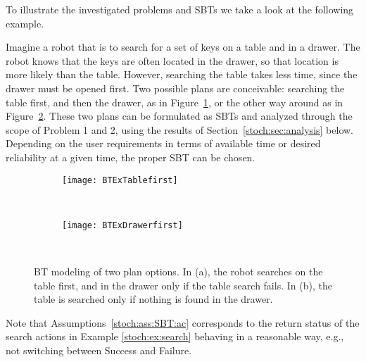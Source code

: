 To illustrate the investigated problems and SBTs we take a look at the following example.
\begin{example}
\label{stoch:ex:search}
Imagine a robot that is to search for a set of keys on a table and in a drawer. The robot knows that the keys are often located in the drawer, so that location is more likely than the table. However, searching the table takes less time, since the drawer must be opened first. Two possible plans are conceivable: searching the table first, and then the drawer, as in Figure~\ref{stoch:fig:searcht}, or the other way around as in Figure~\ref{stoch:fig:searchd}. These two plans can be formulated as SBTs and analyzed through the scope of Problem 1 and 2, using the results of Section~\ref{stoch:sec:analysis} below. Depending on the user requirements in terms of available time or desired reliability at a given time, the proper SBT can be chosen.
\begin{figure}
        \centering
        \begin{subfigure}[b]{0.5\columnwidth}
                \centering
                \texttt{[image: BTExTablefirst]}
                \caption{}%
                 \label{stoch:fig:searcht}

        \end{subfigure}%
       ~ %
        \begin{subfigure}[b]{0.5\columnwidth}
                \centering
                \texttt{[image: BTExDrawerfirst]}
                \caption{}%
                \label{stoch:fig:searchd}
        \end{subfigure}
        ~ %
        
                        \caption{BT modeling of two plan options. In (a), the robot searches on the table first, and in the drawer only if the table search fails. In (b), the table is searched only if nothing is found in the drawer.}    
                        \label{stoch:fig:search}
\end{figure}
\end{example}
\begin{remark}
 Note that Assumptions~\ref{stoch:ass:SBT:ac} corresponds to the return status  of the search actions in Example \ref{stoch:ex:search} behaving in a reasonable way, e.g., not switching between Success and Failure.
\end{remark}












